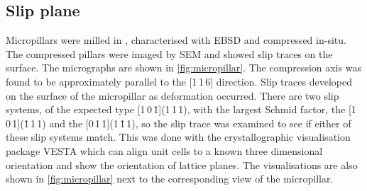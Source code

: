 \subsection{Slip plane}





Micropillars were milled in , characterised with EBSD and compressed in-situ. The compressed pillars were imaged by SEM and showed slip traces on the surface. The micrographs are shown in \autoref{fig:micropillar}. The compression axis was found to be approximately parallel to the [1\,1\,6] direction. Slip traces developed on the surface of the micropillar as deformation occurred. There are two slip systems, of the expected type [1\,0\,\={1}](1\,1\,1), with the largest Schmid factor, the [1\,0\,1](\={1}\,1\,1) and the [0\,1\,1](1\,\={1}\,1), so the slip trace was examined to see if either of these slip systems match. This was done with the crystallographic visualisation package VESTA \cite{Momma2011} which can align unit cells to a known three dimensional orientation and show the orientation of lattice planes. The visualisations are also shown in \autoref{fig:micropillar} next to the corresponding view of the micropillar.





